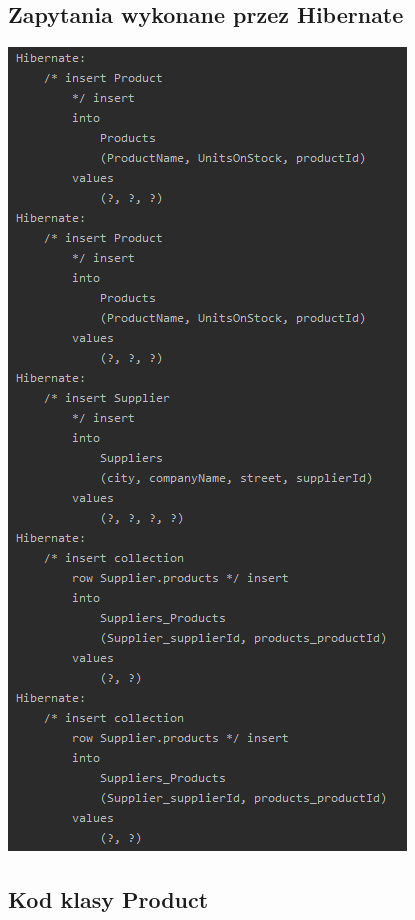 \documentclass[a4paper, 11pt]{article}
\begin{document}
    \subsection{Zapytania wykonane przez Hibernate}
    \begin{center}
        \includegraphics[scale=1.3]{images/point4_additional_table/hibernateQueries.png}
    \end{center}

    \newpage

    \subsection{Kod klasy Product}
    
\end{document}
